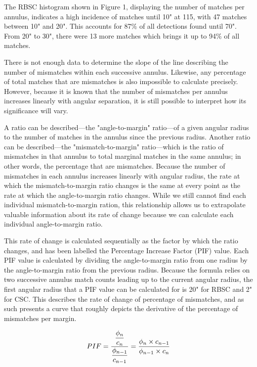 \documentclass[10pt]{article}
\begin{document}
\begin{multicols}{2}
The RBSC histogram shown in Figure 1, displaying the number of matches per annulus, indicates a high incidence of matches until 10" at 115, with 47 matches between 10" and 20". This accounts for 87\% of all detections found until 70". From 20" to 30", there were 13 more matches which brings it up to 94\% of all matches. 

There is not enough data to determine the slope of the line describing the number of mismatches within each successive annulus. Likewise, any percentage of total matches that are mismatches is also impossible to calculate precisely. However, because it is known that the number of mismatches per annulus increases linearly with angular separation, it is still possible to interpret how its significance will vary.

A ratio can be described---the "angle-to-margin" ratio---of a given angular radius to the number of matches in the annulus since the previous radius. Another ratio can be described---the "mismatch-to-margin" ratio---which is the ratio of mismatches in that annulus to total marginal matches in the same annulus; in other words, the percentage that are mismatches. Because the number of mismatches in each annulus increases linearly with angular radius, the rate at which the mismatch-to-margin ratio changes is the same at every point as the rate at which the angle-to-margin ratio changes. While we still cannot find each individual mismatch-to-margin ration, this relationship allows us to extrapolate valuable information about its rate of change because we can calculate each individual angle-to-margin ratio.

This rate of change is calculated sequentially as the factor by which the ratio changes, and has been labelled the Percentage Increase Factor (PIF) value. Each PIF value is calculated by dividing the angle-to-margin ratio from one radius by the angle-to-margin ratio from the previous radius. Because the formula relies on two successive annulus match counts leading up to the current angular radius, the first angular radius that a PIF value can be calculated for is 20" for RBSC and 2" for CSC. This describes the rate of change of percentage of mismatches, and as such presents a curve that roughly depicts the derivative of the percentage of mismatches per margin. 

\begin{equation}
PIF = \frac{\dfrac{\phi_n}{c_n}}{\dfrac{\phi_{n-1}}{c_{n-1}}} = \frac{\phi_n\times c_{n-1}}{\phi_{n-1}\times c_n}\\
\end{equation}


\end{multicols}
\end{document}

